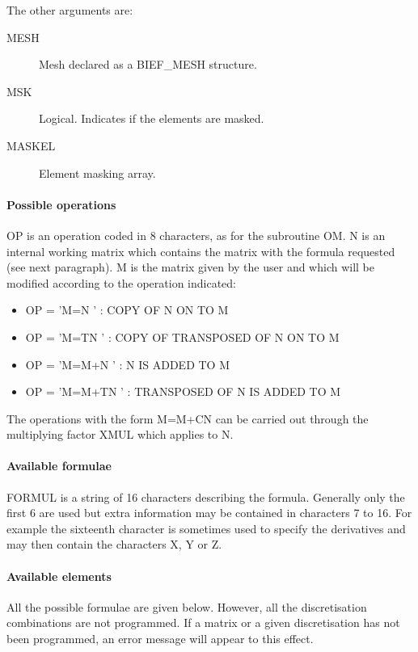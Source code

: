 The other arguments are:
\begin{description}
  \item [MESH] Mesh declared as a BIEF\_MESH structure.
  \item [MSK] Logical. Indicates if the elements are masked.
  \item [MASKEL] Element masking array.
\end{description}

\paragraph{Possible operations}

OP is an operation coded in 8 characters, as for the subroutine OM. N is an
internal working matrix which contains the matrix with the formula requested
(see next paragraph). M is the matrix given by the user and which will be
modified according to the operation indicated:

\begin{itemize}
  \item OP = 'M=N     ' : COPY OF N ON TO M
  \item OP = 'M=TN    ' : COPY OF TRANSPOSED OF N ON TO M
  \item OP = 'M=M+N   ' : N IS ADDED TO M
  \item OP = 'M=M+TN  ' : TRANSPOSED OF N IS ADDED TO M
\end{itemize}

The operations with the form M=M+CN can be carried out through the multiplying
factor XMUL which applies to N.

\paragraph{Available formulae}

FORMUL is a string of 16 characters describing the formula. Generally only the
first 6 are used but extra information may be contained in characters 7 to 16.
For example the sixteenth character is sometimes used to specify the
derivatives and may then contain the characters X, Y or Z.

\paragraph{Available elements}

All the possible formulae are given below. However, all the discretisation
combinations are not programmed. If a matrix or a given discretisation has not
been programmed, an error message will appear to this effect.

